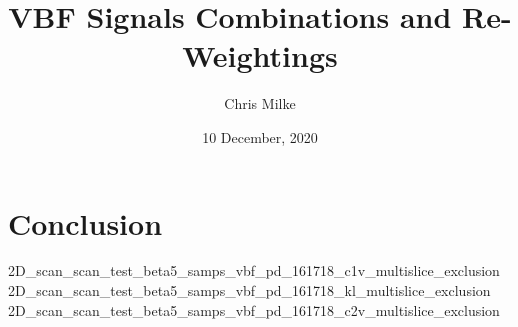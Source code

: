 \documentclass{beamer}
\begin{document}
    \title{VBF Signals Combinations and Re-Weightings}
    \author{Chris Milke}
    \date{10 December, 2020}

    \frame{\titlepage}

    
    
    

    \section{Conclusion}
    {2D_scan_scan_test_beta5_samps_vbf_pd_161718_c1v_multislice_exclusion}
    {2D_scan_scan_test_beta5_samps_vbf_pd_161718_kl_multislice_exclusion}
    {2D_scan_scan_test_beta5_samps_vbf_pd_161718_c2v_multislice_exclusion}

    
\end{document}
